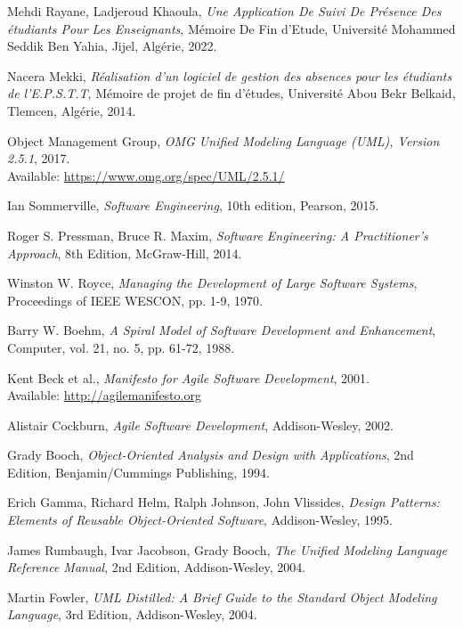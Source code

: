 \documentclass[12pt,a4paper]{report}
\begin{document}
\begin{thebibliography}{9}
Mehdi Rayane, Ladjeroud Khaoula, \textit{Une Application De Suivi De Présence Des étudiants Pour Les Enseignants}, Mémoire De Fin d'Etude, Université Mohammed Seddik Ben Yahia, Jijel, Algérie, 2022.

Nacera Mekki, \textit{Réalisation d'un logiciel de gestion des absences pour les étudiants de l'E.P.S.T.T}, Mémoire de projet de fin d'études, Université Abou Bekr Belkaid, Tlemcen, Algérie, 2014.

Object Management Group, \textit{OMG Unified Modeling Language (UML), Version 2.5.1}, 2017.\\
Available: \url{https://www.omg.org/spec/UML/2.5.1/}

Ian Sommerville, \textit{Software Engineering}, 10th edition, Pearson, 2015.

Roger S. Pressman, Bruce R. Maxim, \textit{Software Engineering: A Practitioner's Approach}, 8th Edition, McGraw-Hill, 2014.

Winston W. Royce, \textit{Managing the Development of Large Software Systems}, Proceedings of IEEE WESCON, pp. 1-9, 1970.

Barry W. Boehm, \textit{A Spiral Model of Software Development and Enhancement}, Computer, vol. 21, no. 5, pp. 61-72, 1988.

Kent Beck et al., \textit{Manifesto for Agile Software Development}, 2001.\\
Available: \url{http://agilemanifesto.org}

Alistair Cockburn, \textit{Agile Software Development}, Addison-Wesley, 2002.

Grady Booch, \textit{Object-Oriented Analysis and Design with Applications}, 2nd Edition, Benjamin/Cummings Publishing, 1994.

Erich Gamma, Richard Helm, Ralph Johnson, John Vlissides, \textit{Design Patterns: Elements of Reusable Object-Oriented Software}, Addison-Wesley, 1995.

James Rumbaugh, Ivar Jacobson, Grady Booch, \textit{The Unified Modeling Language Reference Manual}, 2nd Edition, Addison-Wesley, 2004.


Martin Fowler, \textit{UML Distilled: A Brief Guide to the Standard Object Modeling Language}, 3rd Edition, Addison-Wesley, 2004.


\end{thebibliography}
\end{document}
